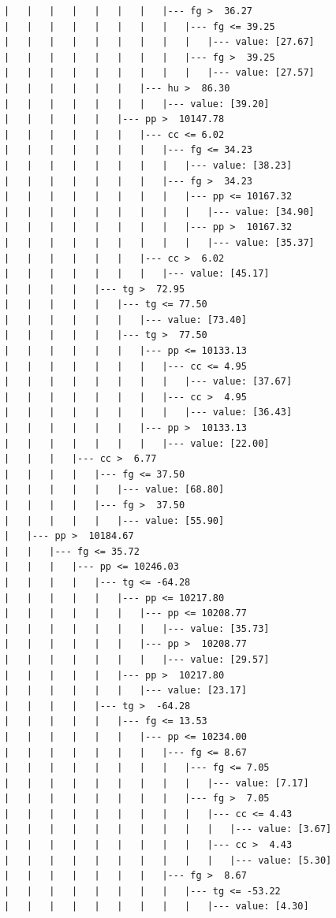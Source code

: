 \documentclass[UTF8, a4paper]{ctexart}
\begin{document}
\begin{lstlisting}
|   |   |   |   |   |   |   |--- fg >  36.27
|   |   |   |   |   |   |   |   |--- fg <= 39.25
|   |   |   |   |   |   |   |   |   |--- value: [27.67]
|   |   |   |   |   |   |   |   |--- fg >  39.25
|   |   |   |   |   |   |   |   |   |--- value: [27.57]
|   |   |   |   |   |   |--- hu >  86.30
|   |   |   |   |   |   |   |--- value: [39.20]
|   |   |   |   |   |--- pp >  10147.78
|   |   |   |   |   |   |--- cc <= 6.02
|   |   |   |   |   |   |   |--- fg <= 34.23
|   |   |   |   |   |   |   |   |--- value: [38.23]
|   |   |   |   |   |   |   |--- fg >  34.23
|   |   |   |   |   |   |   |   |--- pp <= 10167.32
|   |   |   |   |   |   |   |   |   |--- value: [34.90]
|   |   |   |   |   |   |   |   |--- pp >  10167.32
|   |   |   |   |   |   |   |   |   |--- value: [35.37]
|   |   |   |   |   |   |--- cc >  6.02
|   |   |   |   |   |   |   |--- value: [45.17]
|   |   |   |   |--- tg >  72.95
|   |   |   |   |   |--- tg <= 77.50
|   |   |   |   |   |   |--- value: [73.40]
|   |   |   |   |   |--- tg >  77.50
|   |   |   |   |   |   |--- pp <= 10133.13
|   |   |   |   |   |   |   |--- cc <= 4.95
|   |   |   |   |   |   |   |   |--- value: [37.67]
|   |   |   |   |   |   |   |--- cc >  4.95
|   |   |   |   |   |   |   |   |--- value: [36.43]
|   |   |   |   |   |   |--- pp >  10133.13
|   |   |   |   |   |   |   |--- value: [22.00]
|   |   |   |--- cc >  6.77
|   |   |   |   |--- fg <= 37.50
|   |   |   |   |   |--- value: [68.80]
|   |   |   |   |--- fg >  37.50
|   |   |   |   |   |--- value: [55.90]
|   |--- pp >  10184.67
|   |   |--- fg <= 35.72
|   |   |   |--- pp <= 10246.03
|   |   |   |   |--- tg <= -64.28
|   |   |   |   |   |--- pp <= 10217.80
|   |   |   |   |   |   |--- pp <= 10208.77
|   |   |   |   |   |   |   |--- value: [35.73]
|   |   |   |   |   |   |--- pp >  10208.77
|   |   |   |   |   |   |   |--- value: [29.57]
|   |   |   |   |   |--- pp >  10217.80
|   |   |   |   |   |   |--- value: [23.17]
|   |   |   |   |--- tg >  -64.28
|   |   |   |   |   |--- fg <= 13.53
|   |   |   |   |   |   |--- pp <= 10234.00
|   |   |   |   |   |   |   |--- fg <= 8.67
|   |   |   |   |   |   |   |   |--- fg <= 7.05
|   |   |   |   |   |   |   |   |   |--- value: [7.17]
|   |   |   |   |   |   |   |   |--- fg >  7.05
|   |   |   |   |   |   |   |   |   |--- cc <= 4.43
|   |   |   |   |   |   |   |   |   |   |--- value: [3.67]
|   |   |   |   |   |   |   |   |   |--- cc >  4.43
|   |   |   |   |   |   |   |   |   |   |--- value: [5.30]
|   |   |   |   |   |   |   |--- fg >  8.67
|   |   |   |   |   |   |   |   |--- tg <= -53.22
|   |   |   |   |   |   |   |   |   |--- value: [4.30]

\end{lstlisting}
\end{document}
